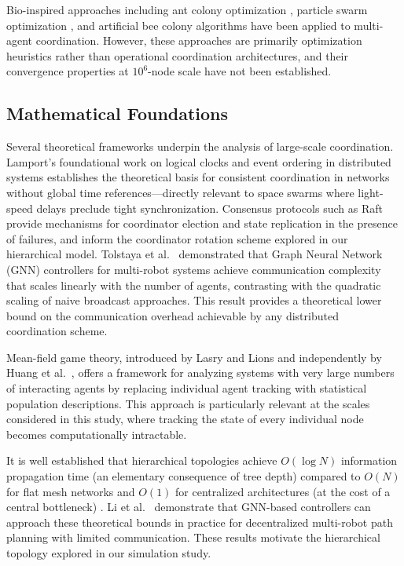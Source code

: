 \documentclass[journal]{IEEEtran}
\begin{document}
Bio-inspired approaches including ant colony optimization \cite{dorigo_aco}, particle swarm optimization \cite{kennedy_pso}, and artificial bee colony algorithms \cite{karaboga_abc} have been applied to multi-agent coordination. However, these approaches are primarily optimization heuristics rather than operational coordination architectures, and their convergence properties at $10^6$-node scale have not been established.

\subsection{Mathematical Foundations}

Several theoretical frameworks underpin the analysis of large-scale coordination. Lamport's foundational work on logical clocks and event ordering in distributed systems \cite{lamport_clocks} establishes the theoretical basis for consistent coordination in networks without global time references---directly relevant to space swarms where light-speed delays preclude tight synchronization. Consensus protocols such as Raft \cite{ongaro_raft} provide mechanisms for coordinator election and state replication in the presence of failures, and inform the coordinator rotation scheme explored in our hierarchical model. Tolstaya et al.~\cite{tolstaya_gnn} demonstrated that Graph Neural Network (GNN) controllers for multi-robot systems achieve communication complexity that scales linearly with the number of agents, contrasting with the quadratic scaling of naive broadcast approaches. This result provides a theoretical lower bound on the communication overhead achievable by any distributed coordination scheme.

Mean-field game theory, introduced by Lasry and Lions \cite{lasry_mfg} and independently by Huang et al.~\cite{huang_mfg}, offers a framework for analyzing systems with very large numbers of interacting agents by replacing individual agent tracking with statistical population descriptions. This approach is particularly relevant at the scales considered in this study, where tracking the state of every individual node becomes computationally intractable.

It is well established that hierarchical topologies achieve $O(\log N)$ information propagation time (an elementary consequence of tree depth) compared to $O(N)$ for flat mesh networks and $O(1)$ for centralized architectures (at the cost of a central bottleneck) \cite{lynch_distributed}. Li et al.~\cite{li_decentralized} demonstrate that GNN-based controllers can approach these theoretical bounds in practice for decentralized multi-robot path planning with limited communication. These results motivate the hierarchical topology explored in our simulation study.
\end{document}
